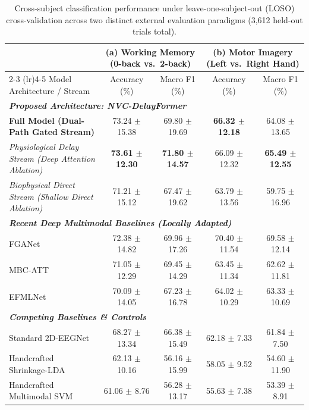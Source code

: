 \documentclass[journal]{IEEEtran}
\begin{document}
\begin{table}[!t]
\centering
\caption{Cross-subject classification performance under leave-one-subject-out (LOSO) cross-validation across two distinct external evaluation paradigms (3,612 held-out trials total).}
\label{tab:external_tasks}
{\footnotesize
\setlength{\tabcolsep}{4.5pt}
\begin{tabular}{lcccc}
\toprule
& \multicolumn{2}{c}{\textbf{(a) Working Memory (0-back vs.\ 2-back)}} & \multicolumn{2}{c}{\textbf{(b) Motor Imagery (Left vs.\ Right Hand)}} \\
\cmidrule(lr){2-3} \cmidrule(lr){4-5}
Model Architecture / Stream & Accuracy (\%) & Macro F1 (\%) & Accuracy (\%) & Macro F1 (\%) \\
\midrule
\multicolumn{5}{l}{\textit{\textbf{Proposed Architecture: NVC-DelayFormer}}} \\
\quad \textbf{Full Model (Dual-Path Gated Stream)} & 73.24 $\pm$ 15.38 & 69.80 $\pm$ 19.69 & \textbf{66.32 $\pm$ 12.18} & 64.08 $\pm$ 13.65 \\
\quad \textit{Physiological Delay Stream (Deep Attention Ablation)} & \textbf{73.61 $\pm$ 12.30} & \textbf{71.80 $\pm$ 14.57} & 66.09 $\pm$ 12.32 & \textbf{65.49 $\pm$ 12.55} \\
\quad \textit{Biophysical Direct Stream (Shallow Direct Ablation)} & 71.21 $\pm$ 15.12 & 67.47 $\pm$ 19.62 & 63.79 $\pm$ 13.56 & 59.75 $\pm$ 16.96 \\
\midrule
\multicolumn{5}{l}{\textit{\textbf{Recent Deep Multimodal Baselines (Locally Adapted)}}} \\
\quad FGANet \cite{kwak2022fganet} & 72.38 $\pm$ 14.82 & 69.96 $\pm$ 17.26 & 70.40 $\pm$ 11.54 & 69.58 $\pm$ 12.14 \\
\quad MBC-ATT \cite{li2024mbcatt} & 71.05 $\pm$ 12.29 & 69.45 $\pm$ 14.29 & 63.45 $\pm$ 11.34 & 62.62 $\pm$ 11.81 \\
\quad EFMLNet \cite{qiu2025efmlnet} & 70.09 $\pm$ 14.05 & 67.23 $\pm$ 16.78 & 64.02 $\pm$ 10.29 & 63.33 $\pm$ 10.69 \\
\midrule
\multicolumn{5}{l}{\textit{\textbf{Competing Baselines \& Controls}}} \\
\quad Standard 2D-EEGNet \cite{lawhern2018eegnet} & 68.27 $\pm$ 13.34 & 66.38 $\pm$ 15.49 & 62.18 $\pm$ 7.33 & 61.84 $\pm$ 7.50 \\
\quad Handcrafted Shrinkage-LDA \cite{shin2017open} & 62.13 $\pm$ 10.16 & 56.16 $\pm$ 15.99 & 58.05 $\pm$ 9.52 & 54.60 $\pm$ 11.90 \\
\quad Handcrafted Multimodal SVM & 61.06 $\pm$ 8.76 & 56.28 $\pm$ 13.17 & 55.63 $\pm$ 7.38 & 53.39 $\pm$ 8.91 \\

\end{tabular}}
\end{table}
\end{document}
